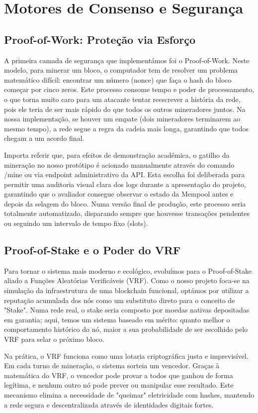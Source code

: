 \documentclass[11pt]{article}
\begin{document}
\section{Motores de Consenso e Segurança}

\subsection{Proof-of-Work: Proteção via Esforço}
A primeira camada de segurança que implementámos foi o Proof-of-Work. Neste modelo, para minerar um bloco, o computador tem de resolver um problema matemático difícil: encontrar um número (nonce) que faça o hash do bloco começar por cinco zeros. Este processo consome tempo e poder de processamento, o que torna muito caro para um atacante tentar reescrever a história da rede, pois ele teria de ser mais rápido do que todos os outros mineradores juntos. Na nossa implementação, se houver um empate (dois mineradores terminarem ao mesmo tempo), a rede segue a regra da cadeia mais longa, garantindo que todos chegam a um acordo final.

Importa referir que, para efeitos de demonstração académica, o gatilho da mineração no nosso protótipo é acionado manualmente através do comando /mine ou via endpoint administrativo da API. Esta escolha foi deliberada para permitir uma auditoria visual clara dos logs durante a apresentação do projeto, garantindo que o avaliador consegue observar o estado da Mempool antes e depois da selagem do bloco. Numa versão final de produção, este processo seria totalmente automatizado, disparando sempre que houvesse transações pendentes ou seguindo um intervalo de tempo fixo (slots).

\subsection{Proof-of-Stake e o Poder do VRF}
Para tornar o sistema mais moderno e ecológico, evoluímos para o Proof-of-Stake aliado a Funções Aleatórias Verificáveis (VRF). Como o nosso projeto foca-se na simulação da infraestrutura de uma blockchain funcional, optámos por utilizar a reputação acumulada dos nós como um substituto direto para o conceito de "Stake". Numa rede real, o stake seria composto por moedas nativas depositadas em garantia; aqui, temos um sistema baseado em mérito: quanto melhor o comportamento histórico do nó, maior a sua probabilidade de ser escolhido pelo VRF para selar o próximo bloco. 

Na prática, o VRF funciona como uma lotaria criptográfica justa e imprevisível. Em cada turno de mineração, o sistema sorteia um vencedor. Graças à matemática do VRF, o vencedor pode provar a todos que ganhou de forma legítima, e nenhum outro nó pode prever ou manipular esse resultado. Este mecanismo elimina a necessidade de "queimar" eletricidade com hashes, mantendo a rede segura e descentralizada através de identidades digitais fortes.
\end{document}
